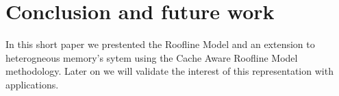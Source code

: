 \documentclass[runningheads,a4paper]{llncs}
\begin{document}





\section{Conclusion and future work}

In this short paper we prestented the Roofline Model and an extension to heterogneous memory's sytem using the Cache Aware
Roofline Model methodology. Later on we will validate the interest of this representation with applications. 




\end{document}
